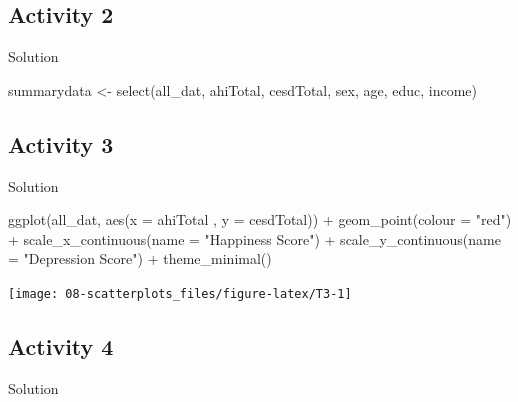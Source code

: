 \documentclass[
  oneside]{book}
\newenvironment{Shaded}{\begin{snugshade}}{\end{snugshade}}
\newcommand{\AttributeTok}[1]{\textcolor[rgb]{0.77,0.63,0.00}{#1}}
\newcommand{\FunctionTok}[1]{\textcolor[rgb]{0.00,0.00,0.00}{#1}}
\newcommand{\NormalTok}[1]{#1}
\newcommand{\OtherTok}[1]{\textcolor[rgb]{0.56,0.35,0.01}{#1}}
\newcommand{\SpecialCharTok}[1]{\textcolor[rgb]{0.00,0.00,0.00}{#1}}
\newcommand{\StringTok}[1]{\textcolor[rgb]{0.31,0.60,0.02}{#1}}
\begin{document}
\hypertarget{activity-2-2}{%
\subsection{Activity 2}\label{activity-2-2}}

Solution

\begin{Shaded}
\begin{Highlighting}[]
\NormalTok{summarydata }\OtherTok{\textless{}{-}} \FunctionTok{select}\NormalTok{(all\_dat, ahiTotal, cesdTotal, sex, age, educ, income)}
\end{Highlighting}
\end{Shaded}

\hypertarget{activity-3-1}{%
\subsection{Activity 3}\label{activity-3-1}}

Solution

\begin{Shaded}
\begin{Highlighting}[]
\FunctionTok{ggplot}\NormalTok{(all\_dat, }\FunctionTok{aes}\NormalTok{(}\AttributeTok{x =}\NormalTok{ ahiTotal , }\AttributeTok{y =}\NormalTok{ cesdTotal)) }\SpecialCharTok{+} 
  \FunctionTok{geom\_point}\NormalTok{(}\AttributeTok{colour =} \StringTok{"red"}\NormalTok{) }\SpecialCharTok{+}
  \FunctionTok{scale\_x\_continuous}\NormalTok{(}\AttributeTok{name =} \StringTok{"Happiness Score"}\NormalTok{) }\SpecialCharTok{+}
  \FunctionTok{scale\_y\_continuous}\NormalTok{(}\AttributeTok{name =} \StringTok{"Depression Score"}\NormalTok{) }\SpecialCharTok{+}
  \FunctionTok{theme\_minimal}\NormalTok{()}
\end{Highlighting}
\end{Shaded}

\begin{center}\texttt{[image: 08-scatterplots\_files/figure-latex/T3-1]} \end{center}

\hypertarget{activity-4}{%
\subsection{Activity 4}\label{activity-4}}

Solution
\end{document}
